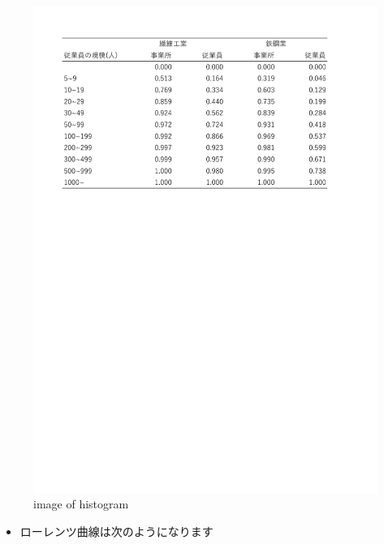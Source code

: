 \documentclass[
]{book}
\providecommand{\tightlist}{%
  \setlength{\itemsep}{0pt}\setlength{\parskip}{0pt}}
\theoremstyle{definition}
\theoremstyle{definition}
\theoremstyle{definition}
\theoremstyle{definition}
\theoremstyle{remark}
\begin{document}
\begin{figure}
\centering
\includegraphics[width=1\textwidth,height=\textheight]{images/lec04/tab_textile_steel2.pdf}
\caption{image of histogram}
\end{figure}

\begin{itemize}
\tightlist
\item
  ローレンツ曲線は次のようになります
\end{itemize}
\end{document}
